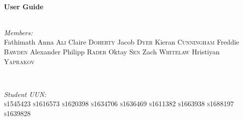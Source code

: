 \documentclass[onecolumn]{IEEEtran}
\begin{document}
\begin{titlepage}
\begin{minipage}{0.45\textwidth}
\begin{flushleft}
\emph{}\\  
\emph{}\\  
\emph{}\\  
\emph{}\\  
\emph{}\\  
\emph{}\\  
\emph{}\\  
\emph{}\\  
\emph{}\\  
\emph{}\\  
\end{flushleft}
\end{minipage}

\HRule \\[0.7cm]
{ \huge \bfseries User Guide}\\[0.4cm] %
\HRule \\[1.5cm]
 

\begin{minipage}{0.45\textwidth}
\begin{flushleft} \large
\emph{Members:}\\
Fathimath Anna \textsc{Ali}
\newline Claire \textsc{Doherty}
\newline Jacob \textsc{Dyer}
\newline Kieran \textsc{Cunningham}
\newline Freddie \textsc{Bawden}
\newline Alexander Philipp \textsc{Rader}
\newline Oktay \textsc{Sen}
\newline Zach \textsc{Whitelaw}
\newline Hristiyan \textsc{Yaprakov}

\end{flushleft}
\end{minipage}
~
\begin{minipage}{0.15\textwidth}
\begin{flushright} \large
\emph{Student UUN:} \\
\textsc{s1545423} 
\textsc{s1616573}
\textsc{s1620398}
\textsc{s1634706}
\textsc{s1636469}
\textsc{s1611382}
\textsc{s1663938}
\textsc{s1688197}
\textsc{s1639828}
\end{flushright}
\end{minipage}\\[1.5cm]


\end{titlepage}
\end{document}
